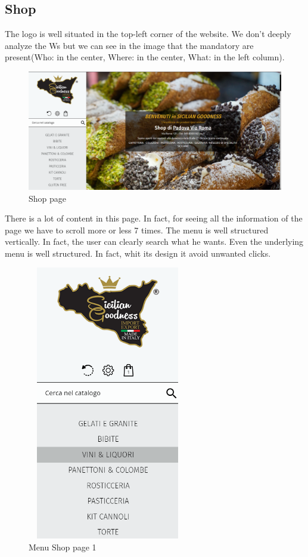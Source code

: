 \subsection{Shop}
The logo is well situated in the top-left corner of the website.
We don't deeply analyze the Ws but we can see in the image that the mandatory are present(Who: in the center, Where: in the center, What: in the left column).

\begin{figure}[H]
	\centering\includegraphics[width=12cm]{Img/Shop.png}
	\caption{Shop page}
\end{figure}

There is a lot of content in this page. In fact, for seeing all the information of the page we have to scroll more or less 7 times.
\newline
The menu is well structured vertically. In fact, the user can clearly search what he wants. 
Even the underlying menu is well structured. In fact, whit its design it avoid unwanted clicks.

\begin{figure}[H]
	\centering\includegraphics[height=12cm, width=7cm]{Img/menushop1.png}
	\caption{Menu Shop page 1}
\end{figure}

